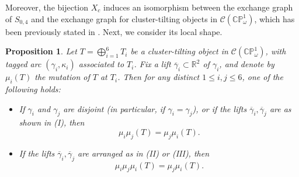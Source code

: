 \documentclass[11pt,a4paper,reqno]{amsart}%
\theoremstyle{plain}
\newtheorem{proposition}[proposition]{Proposition}
\theoremstyle{definition}
\numberwithin{equation}{section}
\numberwithin{equation}{section}
\def\wt{\omega}
\def\CPone{\mathbb{CP}^1_{\wt}}
\def\CCP{\mathcal{C}(\CPone)}
\begin{document}
Moreover,  the bijection $X_c$  induces an isomorphism 
 between the exchange graph %
 of $S_{0,4}$ and the exchange graph 
 for cluster-tilting objects in  $\CCP$,  which has been previously stated in \cite[Theorem 5.11]{BG}.
Next, we consider its local shape.%
 \begin{proposition}\label{prop:commutation-relations} 
 Let $T=\bigoplus_{i=1}^{6}T_{i}$ be  a cluster-tilting object  in  $\CCP$, with tagged arc $(\gamma_i,\kappa_i)$ associated to $T_i$.    Fix a lift  $\overline{\gamma}_i \subset \mathbb{R}^2$   of  $\gamma_i$, and denote by $\mu_i(T)$   the mutation of $T$ at $T_i$. 
Then  for any distinct  $1\le i,j\le 6$, one of the following holds:  


\begin{itemize}
    \item[(1)]  
 If $\gamma_i$ and $\gamma_j$ are disjoint (in particular, if $\gamma_i=\gamma_j$), or  if the lifts $\overline{\gamma}_i,\overline{\gamma}_j$   are as shown in (I), then  \[\mu_{i}\mu_{j}(T)=\mu_{j}\mu_{i}(T).\]


    \item[(2)] If the lifts $\overline{\gamma}_i,\overline{\gamma}_j$ are arranged as in (II) or (III),   then  
    \[\mu_i \mu_j \mu_i(T) = \mu_j \mu_i  (T).\]
\end{itemize}
 \end{proposition} 
 
\end{document}

